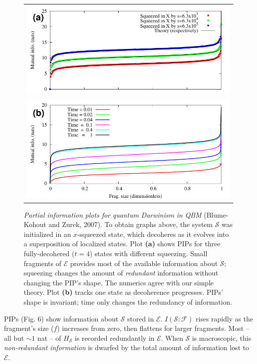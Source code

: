 \documentclass[aps,twocolumn,rmp,epsfig]{revtex4}
\newcommand{\Sys}{\ensuremath{\mathcal{S}}}
\newcommand{\Env}{\ensuremath{\mathcal{E}}}
\newcommand{\Hh}{\ensuremath{H}}
\newcommand{\Hs}{\ensuremath{\Hh_{\Sys}}}
\def\FCW{0.98\columnwidth}
\newcommand{\cS}        {{\mathcal S}}
\newcommand{\cE}        {{\mathcal E}}
\newcommand{\+}         {\dagger}
\newcommand\cF{{\mathcal F}}
\begin{document}
{\begin{figure}[tb]
\begin{tabular}{l}
\vspace{-0.15in} \includegraphics[width=\FCW]{PIP1.pdf}\\
\includegraphics[width=\FCW]{PIP2.pdf}\\
\end{tabular}
\caption{\emph{Partial information plots for quantum Darwinism in QBM} (Blume-Kohout and Zurek, 2007). To obtain graphs above, the system $\Sys$ was initialized in an $x$-squeezed state, which decoheres as it evolves into a superposition of localized states.  Plot \textbf{(a)} shows PIPs for three fully-decohered ($t=4$) states with different squeezing.  Small fragments of $\Env$ provides most of the available information about $\Sys$; squeezing changes the amount of \emph{redundant} information without changing the PIP's shape.  The numerics agree with our simple theory.  Plot \textbf{(b)} tracks one state as decoherence progresses.  PIPs' shape is invariant; time only changes the redundancy of information.}
\label{figPIPs}
\end{figure}

PIPs (Fig. 6) show information about $\Sys$ stored in $\Env$.
$I(\cS :\cF )$ rises rapidly as the fragment's size ($f$) increases from zero,
then flattens for larger fragments.  
Most -- all but $\sim1$ nat -- of $\Hs$ is recorded redundantly in $\cE$.
When $\Sys$ is macroscopic, this \emph{non-redundant information}
is dwarfed by the total amount of information lost to $\Env$.

}
\end{document}
